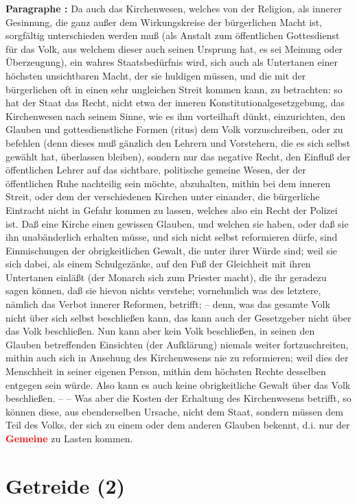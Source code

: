 \documentclass[a4paper,12pt,twoside]{book}
\newcommand{\match}[1]{\textcolor{red}{\textbf{#1}}}
\newcommand{\unnumberedsection}[1]{
	\section*{#1}
	\addcontentsline{toc}{section}{#1}
	\markright{#1}
}
\begin{document}
	\textbf{Paragraphe : }Da auch das Kirchenwesen, welches von der Religion, als innerer Gesinnung, die ganz außer dem Wirkungskreise der bürgerlichen Macht ist, sorgfältig unterschieden werden muß (als Anstalt zum öffentlichen Gottesdienst für das Volk, aus welchem dieser auch seinen Ursprung hat, es sei Meinung oder Überzeugung), ein wahres Staatsbedürfnis  wird, sich auch als Untertanen einer höchsten unsichtbaren Macht, der sie huldigen müssen, und die mit der bürgerlichen oft in einen sehr ungleichen Streit kommen kann, zu betrachten: so hat der Staat das Recht, nicht etwa der inneren Konstitutionalgesetzgebung, das Kirchenwesen nach seinem Sinne, wie es ihm vorteilhaft dünkt, einzurichten, den Glauben und gottesdienstliche Formen (ritus) dem Volk vorzuschreiben, oder zu befehlen (denn dieses muß gänzlich den Lehrern und Vorstehern, die es sich selbst gewählt hat, überlassen bleiben), sondern nur das negative Recht, den Einfluß der öffentlichen Lehrer auf das sichtbare, politische gemeine Wesen, der der öffentlichen Ruhe nachteilig sein möchte, abzuhalten, mithin bei dem inneren Streit, oder dem der verschiedenen Kirchen unter einander, die bürgerliche Eintracht nicht in Gefahr kommen zu lassen, welches also ein Recht der Polizei ist. Daß eine Kirche einen gewissen Glauben, und welchen sie haben, oder daß sie ihn unabänderlich erhalten müsse, und sich nicht selbst reformieren dürfe, sind Einmischungen der obrigkeitlichen Gewalt, die unter ihrer Würde sind; weil sie sich dabei, als einem Schulgezänke, auf den Fuß der Gleichheit mit ihren Untertanen einläßt (der Monarch sich zum Priester macht), die ihr geradezu sagen können, daß sie hievon nichts verstehe; vornehmlich was des letztere, nämlich das Verbot innerer Reformen, betrifft; – denn, was das gesamte Volk nicht über sich selbst beschließen kann, das kann auch der Gesetzgeber nicht über das Volk beschließen. Nun kann aber kein Volk beschließen, in seinen den Glauben betreffenden Einsichten (der Aufklärung) niemals weiter fortzuschreiten, mithin auch sich in Ansehung des Kirchenwesens nie zu reformieren; weil dies der Menschheit in seiner eigenen Person, mithin dem höchsten Rechte desselben entgegen sein würde. Also kann es auch keine obrigkeitliche Gewalt über das Volk beschließen. – – Was aber die Kosten der Erhaltung des Kirchenwesens betrifft, so können diese, aus ebenderselben Ursache, nicht dem Staat, sondern müssen dem Teil des Volks, der sich zu einem oder dem anderen Glauben bekennt, d.i. nur der \match{Gemeine} zu Lasten kommen. 
	
	\unnumberedsection{Getreide (2)} 
\end{document}
